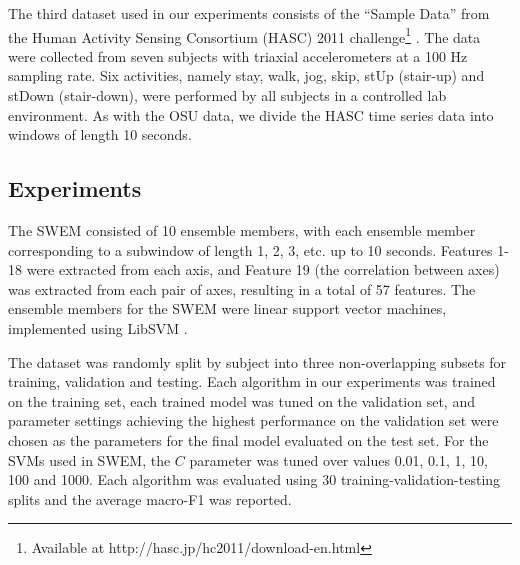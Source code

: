 \documentclass[letterpaper]{article}
\begin{document}

The third dataset used in our experiments consists of the ``Sample Data'' from the Human Activity Sensing Consortium (HASC) 2011 challenge\footnote{Available at http://hasc.jp/hc2011/download-en.html} \cite{kawaguchi2011hasc}. The data were collected from seven subjects with triaxial accelerometers at a 100 Hz sampling rate. Six activities, namely stay, walk, jog, skip, stUp (stair-up) and stDown (stair-down), were performed by all subjects in a controlled lab environment. As with the OSU data, we divide the HASC time series data into windows of length 10 seconds.

\subsection{Experiments}
The SWEM consisted of 10 ensemble members, with each ensemble member corresponding to a subwindow of length 1, 2, 3, etc. up to  10 seconds. Features 1-18 were extracted from each axis, and Feature 19 (the correlation between axes) was extracted from each pair of axes, resulting in a total of 57 features. The ensemble members for the SWEM were linear support vector machines, implemented using LibSVM \cite{chang2011libsvm}.

The dataset was randomly split by subject into three non-overlapping subsets for training, validation and testing. Each algorithm in our experiments was trained on the training set, each trained model was tuned on the validation set, and parameter settings achieving the highest performance on the validation set were chosen as the parameters for the final model evaluated on the test set. For the SVMs used in SWEM, the $C$ parameter was tuned over values 0.01, 0.1, 1, 10, 100 and 1000. Each algorithm was evaluated using 30 training-validation-testing splits and the average macro-F1 was reported. 
\end{document}
